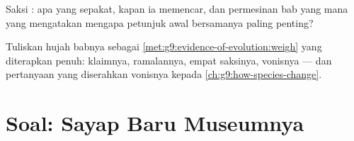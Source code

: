 \begin{exercise}[$\star\star$]\label{exo:g9:evidence-of-evolution:11}
Saksi : apa yang sepakat, kapan ia memencar, dan
permesinan bab yang mana yang mengatakan mengapa petunjuk
awal bersamanya paling penting?
\end{exercise}

\begin{exercise}[$\star\star\star$]\label{exo:g9:evidence-of-evolution:12}
Tuliskan hujah babnya sebagai
\cref{met:g9:evidence-of-evolution:weigh} yang diterapkan
penuh: klaimnya, ramalannya, empat saksinya, vonisnya ---
dan pertanyaan yang diserahkan vonisnya kepada
\cref{ch:g9:how-species-change}.
\end{exercise}

\section{Soal: Sayap Baru Museumnya}

